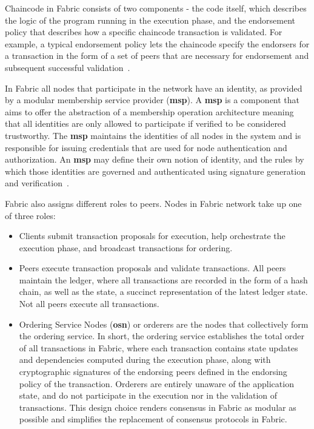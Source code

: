 Chaincode in Fabric consists of two components - the code itself, which
describes the logic of the program running in the execution phase, and the
endorsement policy that describes how a specific chaincode transaction is
validated. For example, a typical endorsement policy lets the chaincode specify
the endorsers for a transaction in the form of a set of peers that are
necessary for endorsement and subsequent successful
validation~\cite{Androulaki2018}.

In Fabric all nodes that participate in the network have an identity, as
provided by a modular membership service provider (\textbf{msp}).  A
\textbf{msp} is a component that aims to offer the abstraction of a membership
operation architecture meaning that all identities are only allowed to
participate if verified to be considered trustworthy.  The \textbf{msp}
maintains the identities of all nodes in the system and is responsible for
issuing credentials that are used for node authentication and authorization. An
\textbf{msp} may define their own notion of identity, and the rules by which
those identities are governed and authenticated using signature generation and
verification~\cite{HyperledgerFabricDocs2017}.

Fabric also assigns different roles to peers. Nodes in Fabric network take up
one of three roles:

\begin{itemize}
  \item Clients submit transaction proposals for execution, help orchestrate
    the execution phase, and broadcast transactions for ordering.

  \item Peers execute transaction proposals and validate transactions.  All
    peers maintain the ledger, where all transactions  are recorded in the form
    of a hash chain, as well as the state, a succinct representation of the
    latest ledger state. Not all peers execute all transactions.

  \item Ordering Service Nodes (\textbf{osn}) or orderers are the nodes that
    collectively form the ordering service. In short, the ordering service
    establishes the total order of all transactions in Fabric, where each
    transaction contains state updates and dependencies computed during the
    execution phase, along with cryptographic signatures of the endorsing peers
    defined in the endorsing policy of the transaction. Orderers are entirely
    unaware of the application state, and do not participate in the execution
    nor in the validation of transactions. This design choice renders consensus
    in Fabric as modular as possible and simplifies the replacement of
    consensus protocols in Fabric. 
\end{itemize}

